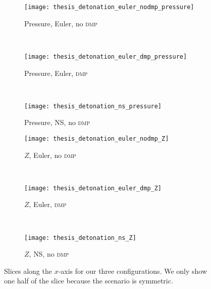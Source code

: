 \begin{figure}[htb]
  \centering
  \begin{subfigure}[t]{0.3\textwidth}
    \centering
    \texttt{[image: thesis\_detonation\_euler\_nodmp\_pressure]}
    \caption{Pressure, Euler, no \textsc{dmp}}
  \end{subfigure}~%
  \begin{subfigure}[t]{0.3\textwidth}
    \centering
    \texttt{[image: thesis\_detonation\_euler\_dmp\_pressure]}
    \caption{Pressure, Euler, \textsc{dmp}}
  \end{subfigure}~%
  \begin{subfigure}[t]{0.3\textwidth}
    \centering
    \texttt{[image: thesis\_detonation\_ns\_pressure]}
    \caption{Pressure, \textsc{NS}, no \textsc{dmp}}
  \end{subfigure}

  \begin{subfigure}[t]{0.3\textwidth}
    \centering
    \texttt{[image: thesis\_detonation\_euler\_nodmp\_Z]}
    \caption{$Z$, Euler, no \textsc{dmp}}
  \end{subfigure}~%
  \begin{subfigure}[t]{0.3\textwidth}
    \centering
    \texttt{[image: thesis\_detonation\_euler\_dmp\_Z]}
    \caption{$Z$, Euler, \textsc{dmp}}
  \end{subfigure}~%
  \begin{subfigure}[t]{0.3\textwidth}
    \centering
    \texttt{[image: thesis\_detonation\_ns\_Z]}
    \caption{$Z$, \textsc{NS}, no \textsc{dmp}}
  \end{subfigure}
  
  \caption{\label{fig:detonation-line-plots}%
    Slices along the $x$-axis for our three configurations.
    We only show one half of the slice because the scenario is symmetric.
  }
\end{figure}

